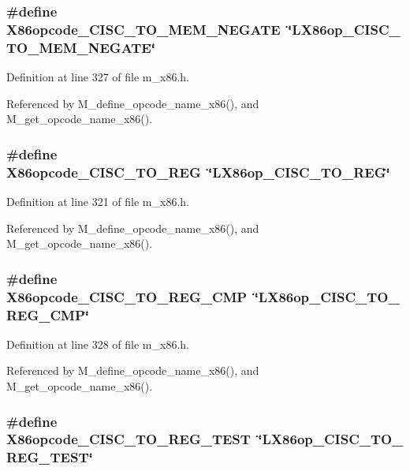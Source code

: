\subsubsection{\setlength{\rightskip}{0pt plus 5cm}\#define X86opcode\_\-CISC\_\-TO\_\-MEM\_\-NEGATE~\char`\"{}LX86op\_\-CISC\_\-TO\_\-MEM\_\-NEGATE\char`\"{}}\label{m__x86_8h_696b3af276a393a0452ef518d586ae6f}




Definition at line 327 of file m\_\-x86.h.

Referenced by M\_\-define\_\-opcode\_\-name\_\-x86(), and M\_\-get\_\-opcode\_\-name\_\-x86().
\subsubsection{\setlength{\rightskip}{0pt plus 5cm}\#define X86opcode\_\-CISC\_\-TO\_\-REG~\char`\"{}LX86op\_\-CISC\_\-TO\_\-REG\char`\"{}}\label{m__x86_8h_5837f8a27c4bf7c0776113b2b2f6cf5e}




Definition at line 321 of file m\_\-x86.h.

Referenced by M\_\-define\_\-opcode\_\-name\_\-x86(), and M\_\-get\_\-opcode\_\-name\_\-x86().
\subsubsection{\setlength{\rightskip}{0pt plus 5cm}\#define X86opcode\_\-CISC\_\-TO\_\-REG\_\-CMP~\char`\"{}LX86op\_\-CISC\_\-TO\_\-REG\_\-CMP\char`\"{}}\label{m__x86_8h_d69afa4da37ea2e14b586ff1951381d3}




Definition at line 328 of file m\_\-x86.h.

Referenced by M\_\-define\_\-opcode\_\-name\_\-x86(), and M\_\-get\_\-opcode\_\-name\_\-x86().
\subsubsection{\setlength{\rightskip}{0pt plus 5cm}\#define X86opcode\_\-CISC\_\-TO\_\-REG\_\-TEST~\char`\"{}LX86op\_\-CISC\_\-TO\_\-REG\_\-TEST\char`\"{}}\label{m__x86_8h_d63586a16ac1a092422bc15f1a1a4dcd}




